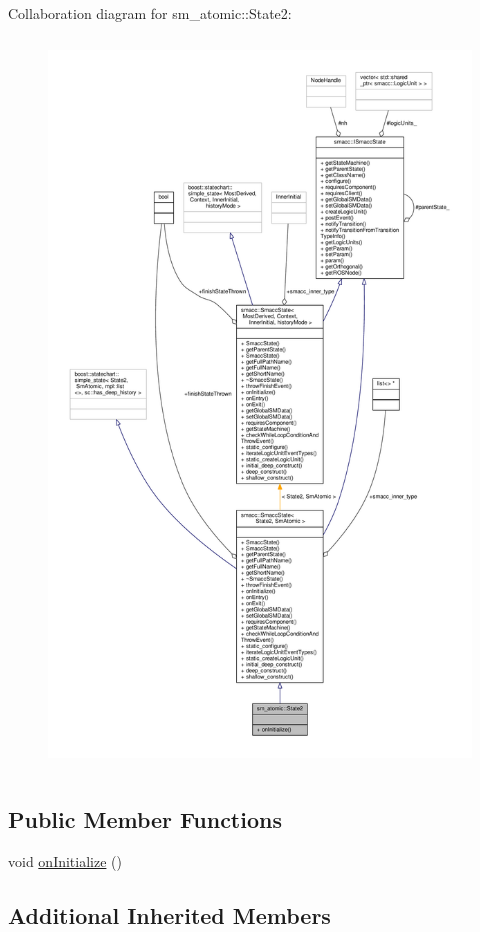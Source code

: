 Collaboration diagram for sm\+\_\+atomic\+:\+:State2\+:\nopagebreak
\begin{figure}[H]
\begin{center}
\leavevmode
\includegraphics[height=550pt]{structsm__atomic_1_1State2__coll__graph}
\end{center}
\end{figure}
\subsection*{Public Member Functions}
\begin{DoxyCompactItemize}
\item 
void \hyperlink{structsm__atomic_1_1State2_abb160f6c17f43949566c5bf6fd352862}{on\+Initialize} ()
\end{DoxyCompactItemize}
\subsection*{Additional Inherited Members}


